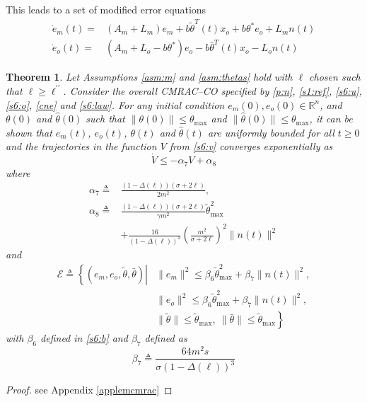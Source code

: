 \documentclass[10pt,journal]{IEEEtran}
\theoremstyle{plain}%
\newtheorem{thm}{Theorem}%
\theoremstyle{definition}
\newcommand{\be}[0]{\begin{equation}}
\newcommand{\ee}[0]{\end{equation}}
\newcommand{\ben}[0]{\begin{equation*}}
\newcommand{\een}[0]{\end{equation*}}
\newcommand{\norms}[1]{\lVert#1\rVert}
\newcommand{\normB}[0]{\norms}
\let\norm=\normB
\renewcommand{\Re}[0]{\mathbb R}
\renewcommand{\IEEEQED}{\IEEEQEDopen}
\begin{document}
This leads to a set of modified error equations
\be
\begin{split}\label{cne}
\dot e_m(t) =& (A_m+L_m) e_m +b \tilde \theta ^T (t)x_o +b\theta^*e_o  +L_m n(t) \\
\dot e_o(t) =& (A_m+L_o-b\theta^*) e_o -b \bar \theta ^T (t)x_o -L_o n(t)
\end{split}
\ee


\begin{thm}\label{lem:cmraco}
Let Assumptions \ref{asm:m} and \ref{asm:thetas} hold with $\ell$ chosen such that $\ell\geq \ell^{\prime\prime}$. Consider the overall CMRAC--CO specified by \eqref{p:n}, \eqref{s1:ref}, \eqref{s6:u},  \eqref{s6:o}, \eqref{cne} and \eqref{s6:law}. For any initial condition $e_m(0),e_o(0)\in \Re^n$, and $\theta(0)$ and $\hat\theta(0)$ such that $\norm{\theta(0)}\leq\theta_\text{max}$ and $\norm{\hat\theta(0)}\leq\theta_\text{max}$, it can be shown that $e_m(t)$, $e_o(t)$, $\theta(t)$ and $\hat\theta(t)$ are uniformly bounded for all $t\geq0$ and the trajectories in the function $V$ from \eqref{s6:v} converges exponentially 
as
\be
\dot V \leq -\alpha_7 V + \alpha_{8}
\ee
where
\be\begin{split}\label{s11:a}
\alpha_7 \triangleq& \frac{\left(1-\Delta(\ell ) \right)\left(\sigma+ 2\ell \right)}{2m^2} , \\ \alpha_{8} \triangleq&  \frac{\left(1-\Delta(\ell ) \right)\left(\sigma+ 2\ell \right)}{\gamma m^2} \tilde\theta_\text{max}^2\\ &+ \frac{16}{\left(1-\Delta(\ell ) \right)^2} \left(\frac{m^2}{\sigma+2 \ell}\right)^2 \norm{n(t)}^2\end{split}\ee
and\ben\begin{split}
\mathcal E \triangleq \left\{   (e_m,e_o,\tilde\theta,\bar\theta) \right | & \norm{e_m}^2  \leq \beta_6 \tilde\theta_\text{max}^2+\beta_7 \norm{n(t)}^2,  \\  &  \left.\norm{e_o}^2 \leq \beta_6  \tilde\theta_\text{max}^2 +\beta_7 \norm{n(t)}^2, \right.   \\ &  \left.\norm {\tilde \theta} \leq \tilde\theta_\text{max},\ \norm {\bar \theta} \leq \tilde\theta_\text{max} \right\}
\end{split}
\een
with $\beta_6$ defined in \eqref{s6:b} and $\beta_7$ defined as
\be\label{s8:b}
\beta_7 \triangleq \frac{64 m^2 s}{\sigma(1-\Delta(\ell))^3}
\ee
\end{thm}
\begin{proof}see Appendix \ref{applemcmrac}\let\IEEEQED\relax\end{proof}
\end{document}
